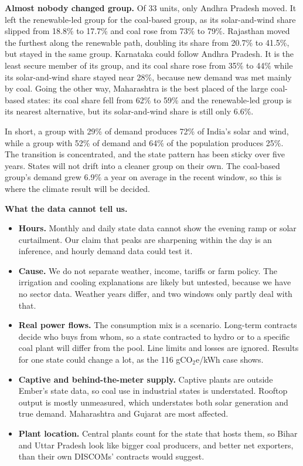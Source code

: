 \documentclass[10pt,a4paper]{article}
\makeatletter
\renewcommand{\section}{\@startsection{section}{1}{0pt}{12pt plus 2pt}{5pt}{\large\bfseries}}
\makeatother
\begin{document}
\textbf{Almost nobody changed group.} Of 33 units, only Andhra Pradesh moved. It left the renewable-led group for the coal-based group, as its solar-and-wind share slipped from 18.8\% to 17.7\% and coal rose from 73\% to 79\%. Rajasthan moved the furthest along the renewable path, doubling its share from 20.7\% to 41.5\%, but stayed in the same group. Karnataka could follow Andhra Pradesh. It is the least secure member of its group, and its coal share rose from 35\% to 44\% while its solar-and-wind share stayed near 28\%, because new demand was met mainly by coal. Going the other way, Maharashtra is the best placed of the large coal-based states: its coal share fell from 62\% to 59\% and the renewable-led group is its nearest alternative, but its solar-and-wind share is still only 6.6\%.

In short, a group with 29\% of demand produces 72\% of India's solar and wind, while a group with 52\% of demand and 64\% of the population produces 25\%. The transition is concentrated, and the state pattern has been sticky over five years. States will not drift into a cleaner group on their own. The coal-based group's demand grew 6.9\% a year on average in the recent window, so this is where the climate result will be decided.

\section{6. Discussion and limitations}
\textbf{What the data cannot tell us.}
\begin{itemize}
\item \textbf{Hours.} Monthly and daily state data cannot show the evening ramp or solar curtailment. Our claim that peaks are sharpening within the day is an inference, and hourly demand data could test it.
\item \textbf{Cause.} We do not separate weather, income, tariffs or farm policy. The irrigation and cooling explanations are likely but untested, because we have no sector data. Weather years differ, and two windows only partly deal with that.
\item \textbf{Real power flows.} The consumption mix is a scenario. Long-term contracts decide who buys from whom, so a state contracted to hydro or to a specific coal plant will differ from the pool. Line limits and losses are ignored. Results for one state could change a lot, as the 116 gCO$_2$e/kWh case shows.
\item \textbf{Captive and behind-the-meter supply.} Captive plants are outside Ember's state data, so coal use in industrial states is understated. Rooftop output is mostly unmeasured, which understates both solar generation and true demand. Maharashtra and Gujarat are most affected.
\item \textbf{Plant location.} Central plants count for the state that hosts them, so Bihar and Uttar Pradesh look like bigger coal producers, and better net exporters, than their own DISCOMs' contracts would suggest.
\end{itemize}
\end{document}
